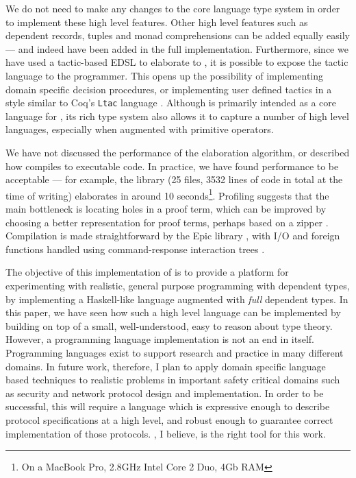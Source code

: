 We do not need to make any changes to the core language type system in order to 
implement these high level features. 
Other high level features such as dependent records, tuples and monad comprehensions
can be added equally easily --- and indeed have been added in the full implementation.  
Furthermore, 
since we have used a tactic-based EDSL to elaborate \Idris{} to \TT{}, it is
possible to expose the tactic language to the programmer. This opens up the
possibility of implementing domain specific decision procedures, or implementing
user defined tactics in a style similar to Coq's \texttt{Ltac} language \cite{Delahaye2000}.
Although \TT{} is primarily intended as a core language for \Idris{}, 
its rich type system also allows it to capture a number of high level languages, especially
when augmented with primitive operators. 

We have not discussed the performance of the elaboration
algorithm, or described how \Idris{} compiles to executable code. In practice,
we have found performance to be acceptable --- for example, the \Idris{}
library (25 files, 3532 lines of code in total at the time of writing)
elaborates in around 10 seconds\footnote{On a MacBook Pro, 2.8GHz Intel Core 2
Duo, 4Gb RAM}. Profiling suggests that the main bottleneck is locating holes
in a proof term, which can be improved by choosing a better representation
for proof terms, perhaps based on a zipper \cite{Huet1997}. Compilation is made
straightforward by the Epic library \cite{brady2011epic}, with I/O and foreign
functions handled using command-response interaction trees \cite{Hancock2000}.

The objective of this implementation of \Idris{} is to provide a platform
for experimenting with realistic, general purpose programming with dependent
types, by implementing a Haskell-like language augmented with \emph{full}
dependent types. 
In this paper, we have seen how such a high level language can be implemented
by building on top of a small, well-understood, easy to reason about type
theory. 
However, a programming language implementation is not an end in itself. 
Programming languages exist to support research and practice in many different
domains. In future work, therefore, I plan to apply domain specific
language based techniques to realistic problems
in important safety critical domains such as security and network protocol
design and implementation. In order to be successful, this will require a language which
is expressive enough to describe protocol specifications at a high level, and robust 
enough to guarantee correct implementation of those protocols. \Idris{}, I believe,
is the right tool for this work.




